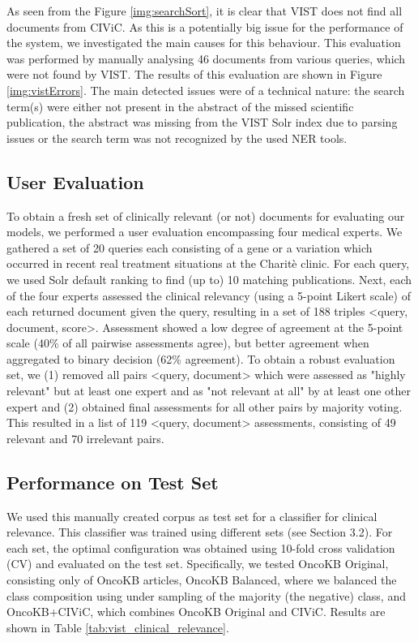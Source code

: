 \documentclass[fleqn,10pt]{wlscirep}
\begin{document}
As seen from the Figure \ref{img:searchSort}, it is clear that VIST does not find all documents from CIViC. As this is a potentially big issue for the performance of the system, we investigated the main causes for this behaviour. This evaluation was performed by manually analysing 46 documents from various queries, which were not found by VIST. The results of this evaluation are shown in Figure \ref{img:vistErrors}. The main detected issues were of a technical nature: the search term(s) were either not present in the abstract of the missed scientific publication, the abstract was missing from the VIST Solr index due to parsing issues or the search term was not recognized by the used NER tools.

\subsection*{User Evaluation}
To obtain a fresh set of clinically relevant (or not) documents for evaluating our models, we performed a user evaluation encompassing four medical experts. We gathered a set of 20 queries each consisting of a gene or a variation which occurred in recent real treatment situations at the Charitè clinic. For each query, we used Solr default ranking to find (up to) 10 matching publications. Next, each of the four experts assessed the clinical relevancy (using a 5-point Likert scale) of each returned document given the query, resulting in a set of 188 triples <query, document, score>. Assessment showed a low degree of agreement at the 5-point scale (40\% of all pairwise assessments agree), but better agreement when aggregated to binary decision (62\% agreement). To obtain a robust evaluation set, we (1) removed all pairs <query, document> which were assessed as "highly relevant" but at least one expert and as "not relevant at all" by at least one other expert and (2) obtained final assessments for all other pairs by majority voting. This resulted in a list of 119 <query, document> assessments, consisting of 49 relevant and 70 irrelevant pairs.

\subsection*{Performance on Test Set}
We used this manually created corpus as test set for a classifier for clinical relevance. This classifier was trained using different sets (see Section 3.2). For each set, the optimal configuration was obtained using 10-fold cross validation (CV) and evaluated on the test set. Specifically, we tested OncoKB Original, consisting only of OncoKB articles, OncoKB Balanced, where we balanced the class composition using under sampling of the majority (the negative) class, and OncoKB+CIViC, which combines OncoKB Original and CIViC. Results are shown in Table \ref{tab:vist_clinical_relevance}. 
\end{document}
